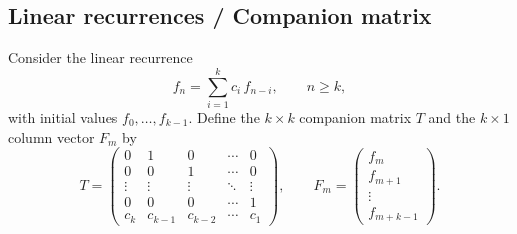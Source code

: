 \subsection*{Linear recurrences / Companion matrix}

Consider the linear recurrence
\[
f_n = \sum_{i=1}^k c_i\, f_{n-i}, \qquad n\ge k,
\]
with initial values $f_0,\dots,f_{k-1}$.  Define the $k\times k$ companion matrix $T$ and the $k\times 1$ column vector $F_m$ by
\[
T =
\begin{pmatrix}
0 & 1 & 0 & \cdots & 0\\[2pt]
0 & 0 & 1 & \cdots & 0\\[2pt]
\vdots & \vdots & \vdots & \ddots & \vdots\\[2pt]
0 & 0 & 0 & \cdots & 1\\[2pt]
c_k & c_{k-1} & c_{k-2} & \cdots & c_1
\end{pmatrix},
\qquad
F_m =
\begin{pmatrix}
f_m\\[4pt]
f_{m+1}\\[4pt]
\vdots\\[4pt]
f_{m+k-1}
\end{pmatrix}.
\]

